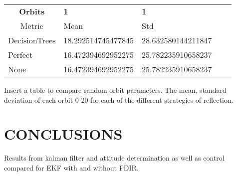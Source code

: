 \documentclass[letterpaper, 10 pt, conference]{ieeeconf}  %
\begin{document}
\begin{table}[]
	\begin{tabular}{|l|l|l|ll}
		\cline{1-3}
		\multicolumn{1}{|c|}{\textbf{Orbits}} & \textbf{1}         & \textbf{1}         &  &  \\ \cline{1-3}
		\multicolumn{1}{|c|}{Metric}          & Mean               & Std                &  &  \\ \cline{1-3}
		DecisionTrees                         & 18.292514745477845 & 28.632580144211847 &  &  \\ \cline{1-3}
		Perfect                               & 16.472394692952275 & 25.782235910658237 &  &  \\ \cline{1-3}
		None                                  & 16.472394692952275 & 25.782235910658237 &  &  \\ \cline{1-3}
	\end{tabular}
\end{table}


Insert a table to compare random orbit parameters. The mean, standard deviation of each orbit 0-20 for each of the different strategies of reflection.

\section{CONCLUSIONS}
Results from kalman filter and attitude determination as well as control compared for EKF with and without FDIR.

\addtolength{\textheight}{-12cm}   %







\end{document}
